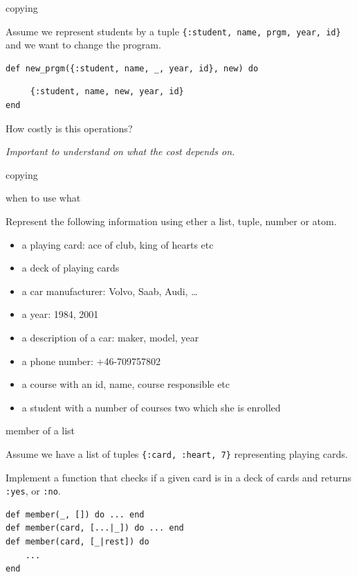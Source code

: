 \begin{frame}[fragile]{copying}

  Assume we represent students by a tuple {\tt \{:student, name, prgm,
    year, id\}} and we want to change the program.

\pause
\begin{verbatim}
def new_prgm({:student, name, _, year, id}, new) do \end{verbatim}\pause\begin{verbatim}
     {:student, name, new, year, id}
end
\end{verbatim}

\pause

How costly is this operations?

\vspace{10pt}
{\em Important to understand on what the cost depends on.}

\end{frame}


\begin{frame}{copying}

\end{frame}

\begin{frame}{when to use what}

Represent the following information using ether a list, tuple, number or atom.
                   
\begin{itemize}
\item a playing card: ace of club, king of hearts etc
\item a deck of playing cards
\item a car manufacturer: Volvo, Saab, Audi, \ldots
\item a year: 1984, 2001
\item a description of a car: maker, model, year
\item a phone number: +46-709757802
\item a course with an id, name, course responsible etc
\item a student with a number of courses two which she is enrolled
\end{itemize}

\end{frame}

\begin{frame}[fragile]{member of a list}

Assume we have a list of tuples {\tt \{:card, :heart, 7\}} representing playing cards. 
\pause

\vspace{10pt}
Implement a function that checks if a given card is in a deck of cards and returns {\tt :yes}, or {\tt :no}.

\begin{verbatim}
def member(_, []) do ... end
def member(card, [...|_]) do ... end
def member(card, [_|rest]) do 
    ... 
end
\end{verbatim}

\end{frame}

